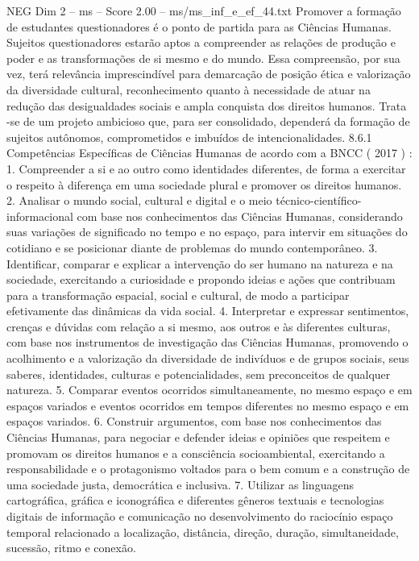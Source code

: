 \begin{textsample}{NEG Dim 2 – ms – Score 2.00 – ms/ms\_inf\_e\_ef\_44.txt}
Promover a formação de estudantes questionadores é o ponto de partida para as Ciências Humanas.
Sujeitos questionadores estarão aptos a compreender as relações de produção e poder e as transformações de si mesmo e do mundo.
Essa compreensão, por sua vez, terá relevância imprescindível para demarcação de posição ética e valorização da diversidade cultural, reconhecimento quanto à necessidade de atuar na redução das desigualdades sociais e ampla conquista dos direitos humanos.
Trata -se de um projeto ambicioso que, para ser consolidado, dependerá da formação de sujeitos autônomos, comprometidos e imbuídos de intencionalidades. 8.6.1 Competências Específicas de Ciências Humanas de acordo com a BNCC ( 2017 ) : 1.
Compreender a si e ao outro como identidades diferentes, de forma a exercitar o respeito à diferença em uma sociedade plural e promover os direitos humanos. 2.
Analisar o mundo social, cultural e digital e o meio técnico-científico-informacional com base nos conhecimentos das Ciências Humanas, considerando suas variações de significado no tempo e no espaço, para intervir em situações do cotidiano e se posicionar diante de problemas do mundo contemporâneo. 3.
Identificar, comparar e explicar a intervenção do ser humano na natureza e na sociedade, exercitando a curiosidade e propondo ideias e ações que contribuam para a transformação espacial, social e cultural, de modo a participar efetivamente das dinâmicas da vida social. 4.
Interpretar e expressar sentimentos, crenças e dúvidas com relação a si mesmo, aos outros e às diferentes culturas, com base nos instrumentos de investigação das Ciências Humanas, promovendo o acolhimento e a valorização da diversidade de indivíduos e de grupos sociais, seus saberes, identidades, culturas e potencialidades, sem preconceitos de qualquer natureza. 5.
Comparar eventos ocorridos simultaneamente, no mesmo espaço e em espaços variados e eventos ocorridos em tempos diferentes no mesmo espaço e em espaços variados. 6.
Construir argumentos, com base nos conhecimentos das Ciências Humanas, para negociar e defender ideias e opiniões que respeitem e promovam os direitos humanos e a consciência socioambiental, exercitando a responsabilidade e o protagonismo voltados para o bem comum e a construção de uma sociedade justa, democrática e inclusiva. 7.
Utilizar as linguagens cartográfica, gráfica e iconográfica e diferentes gêneros textuais e tecnologias digitais de informação e comunicação no desenvolvimento do raciocínio espaço temporal relacionado a localização, distância, direção, duração, simultaneidade, sucessão, ritmo e conexão.

\end{textsample}
